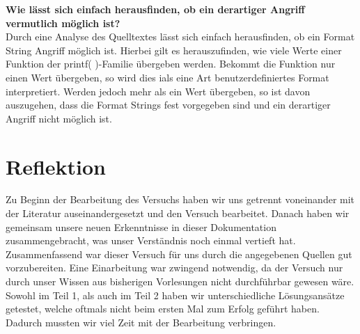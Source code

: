 \documentclass[12pt,a4paper]{article}
\begin{document}
	\textbf{Wie lässt sich einfach herausfinden, ob ein derartiger Angriff vermutlich möglich ist?} \\
	Durch eine Analyse des Quelltextes lässt sich einfach herausfinden, ob ein Format String Angriff möglich ist. Hierbei gilt es herauszufinden, wie viele Werte einer Funktion der printf( )-Familie übergeben werden. Bekommt die Funktion nur einen Wert übergeben, so wird dies ials eine Art benutzerdefiniertes Format interpretiert. Werden jedoch mehr als ein Wert übergeben, so ist davon auszugehen, dass die Format Strings fest vorgegeben sind und ein derartiger Angriff nicht möglich ist. 
	\bigskip
	
	\section*{Reflektion}
	Zu Beginn der Bearbeitung des Versuchs haben wir uns getrennt voneinander mit der Literatur auseinandergesetzt und den Versuch bearbeitet. Danach haben wir gemeinsam unsere neuen Erkenntnisse in dieser Dokumentation zusammengebracht, was unser Verständnis noch einmal vertieft hat.\\
	Zusammenfassend war dieser Versuch für uns durch die angegebenen Quellen gut vorzubereiten. Eine Einarbeitung war zwingend notwendig, da der Versuch nur durch unser Wissen aus bisherigen Vorlesungen nicht durchführbar gewesen wäre.\\
	Sowohl im Teil 1, als auch im Teil 2 haben wir unterschiedliche Lösungsansätze getestet, welche oftmals nicht beim ersten Mal zum Erfolg geführt haben. Dadurch mussten wir viel Zeit mit der Bearbeitung verbringen.
	
\end{document}
